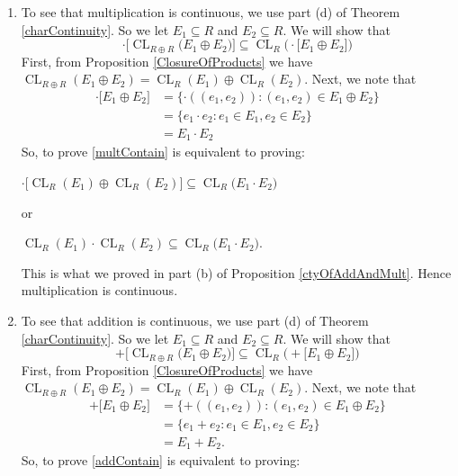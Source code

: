 \documentclass[12pt, oneside]{book}
\def\CL{\operatorname{CL}}
\begin{document}
\begin{enumerate}[label=(\alph*)]
\item To see that multiplication is continuous, we use part (d) of Theorem \ref{charContinuity}. 
So we let $E_1 \subseteq R$ and $E_2 \subseteq R$. We will show that
\begin{equation} \label{multContain}
\cdot \big[\CL_{R \oplus R} \big(E_1 \oplus E_2\big)\big] \subseteq \CL_R\big(\cdot \big[ E_1 \oplus E_2 \big]\big)
\end{equation}
\noindent First, from Proposition \ref{ClosureOfProducts} we have 
$\CL_{R \oplus R}(E_1 \oplus E_2) = \CL_R(E_1) \oplus \CL_R(E_2)$.
\vskip 0.3cm
\noindent Next, we note that
\begin{align*}
\cdot \big[E_1 \oplus E_2\big]
&= \{ \cdot ((e_1, e_2)) : (e_1, e_2) \in E_1 \oplus E_2 \}\\
&= \{ e_1 \cdot e_2 : e_1 \in E_1, e_2 \in E_2 \}\\
&= E_1 \cdot E_2
\end{align*}
\noindent So, to prove \eqref{multContain} is equivalent to proving:
\begin{center}
$\cdot \big[\CL_R(E_1) \oplus \CL_R(E_2)\big] \subseteq \CL_R\big(E_1 \cdot E_2 \big) $
\end{center}
or
\begin{center}
$\CL_R(E_1) \cdot \CL_R(E_2) \subseteq \CL_R\big(E_1 \cdot E_2 \big).$
\end{center}
This is what we proved in part (b) of Proposition \ref{ctyOfAddAndMult}. Hence multiplication 
is continuous.
\item To see that addition is continuous, we use part (d) of Theorem \ref{charContinuity}. 
So we let $E_1 \subseteq R$ and $E_2 \subseteq R$. We will show that
\begin{equation} \label{addContain}
+ \big[\CL_{R \oplus R} \big(E_1 \oplus E_2\big)\big] \subseteq \CL_R\big(+ \big[ E_1 \oplus E_2 \big]\big)
\end{equation}
\noindent First, from Proposition \ref{ClosureOfProducts} we have 
$\CL_{R \oplus R}(E_1 \oplus E_2) = \CL_R(E_1) \oplus \CL_R(E_2)$.
\vskip 0.3cm
\noindent Next, we note that
\begin{align*}
+ \big[E_1 \oplus E_2\big]
&= \{ + ((e_1, e_2)) : (e_1, e_2) \in E_1 \oplus E_2 \}\\
&= \{ e_1 + e_2 : e_1 \in E_1, e_2 \in E_2 \}\\
&= E_1 + E_2.
\end{align*}
\noindent So, to prove \eqref{addContain} is equivalent to proving:

\end{enumerate}
\end{document}
